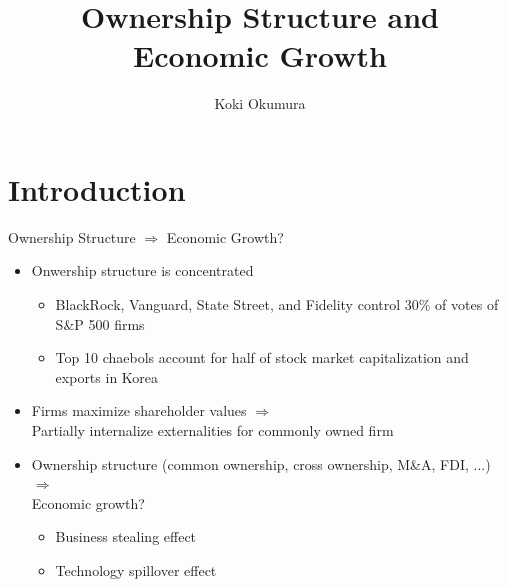 \documentclass[
  10pt, %
  aspectratio=169,  %
  handout
]{beamer}
\title{Ownership Structure and Economic Growth}
\author{Koki Okumura}
\institute{UCLA}
\date{}
\theoremstyle{plain}
\begin{document}
\begin{frame}
  \titlepage
\end{frame}

\section{Introduction}

\begin{frame}{Ownership Structure $\Longrightarrow$ Economic Growth?}
  \label{intro} %
  \begin{itemize}
    \item Onwership structure is concentrated \hfill \hyperlink{share}{}
  \begin{itemize}
    \item BlackRock, Vanguard, State Street, and Fidelity control 30\% of votes
          of S\&P 500 firms
    \item Top 10 chaebols account for half of stock market capitalization
          and exports in Korea
  \end{itemize}
    \medskip{} \pause
    \item Firms maximize shareholder values $\Longrightarrow$ \\
          Partially internalize externalities for commonly owned firm
    \medskip{} \pause
    \item Ownership structure (common ownership, cross ownership, M\&A, FDI, ...) $\Longrightarrow$ \\
          Economic growth?
          \begin{itemize}
            \item Business stealing effect
            \item Technology spillover effect
          \end{itemize}
  \end{itemize}
\end{frame}
\end{document}
